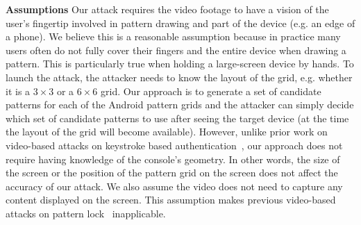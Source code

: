         \noindent \textbf{Assumptions}
        Our attack requires the video footage to have a vision of the user's
        fingertip involved in pattern drawing and part of the device (e.g. an edge of a phone).
        We believe this is a reasonable assumption because in practice many users often do not fully cover their fingers and the entire device when drawing a pattern.
        This is particularly true when holding a large-screen device by hands.
        To launch the
        attack, the attacker needs to know the layout of the grid, e.g. whether it is
        a $3 \times 3$ or a $6 \times 6$ grid. Our approach is to generate a set of
        candidate patterns for each of the Android pattern grids and the attacker can simply decide
        which set of candidate patterns to use after seeing the target device (at the time the
        layout of the grid will become available). However, unlike prior work on
        video-based attacks on keystroke based authentication~\cite{shukla2014beware}, our approach does not
        require having knowledge of the console's geometry. In other words, the size
        of the screen or the position of the pattern grid  on the screen does not
        affect the accuracy of our attack. We also assume the video does not need to
        capture any content displayed on the screen. This assumption makes previous
        video-based attacks on pattern lock~\cite{aviv2010smudge} inapplicable.